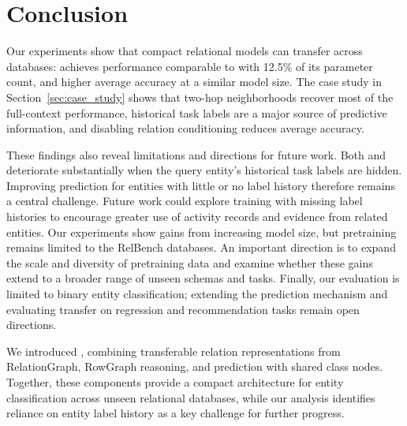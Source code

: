 \section{Conclusion}
\label{sec:conclusion}

Our experiments show that compact relational models can transfer across
databases: \model{} achieves performance comparable to \RT{} with 12.5\%
of its parameter count, and higher average accuracy at a similar model size.
The case study in Section~\ref{sec:case_study} shows that two-hop neighborhoods
recover most of the full-context performance, historical task labels are a
major source of predictive information, and disabling relation conditioning
reduces average accuracy.

These findings also reveal limitations and directions for future work.
Both \model{} and \RT{} deteriorate substantially when the query entity's
historical task labels are hidden. Improving prediction for entities with
little or no label history therefore remains a central challenge. Future
work could explore training with missing label histories to encourage
greater use of activity records and evidence from related entities.
Our experiments show gains from increasing model size, but pretraining
remains limited to the RelBench databases. An important direction is to
expand the scale and diversity of pretraining data and examine whether
these gains extend to a broader range of unseen schemas and tasks.
Finally, our evaluation is limited to binary entity classification;
extending the prediction mechanism and evaluating transfer on regression
and recommendation tasks remain open directions.

We introduced \model{}, combining transferable relation representations
from RelationGraph, RowGraph reasoning, and prediction with shared
class nodes. Together, these components provide a compact architecture for
entity classification across unseen relational databases, while our
analysis identifies reliance on entity label history as a key challenge
for further progress.
